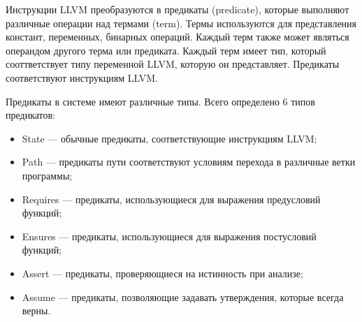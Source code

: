Инструкции LLVM преобразуются в предикаты (predicate), которые выполняют 
различные операции над термами (term). Термы используются для представления 
констант, переменных, бинарных операций. Каждый терм также может являться 
операндом другого терма или предиката. Каждый терм имеет тип, который 
сооттветствует типу переменной LLVM, которую он представляет. Предикаты 
соответствуют инструкциям LLVM.
    
Предикаты в системе имеют различные типы. Всего определено 6 типов предикатов:
\begin{itemize}
\item State --- обычные предикаты, соответствующие инструкциям LLVM;
\item Path --- предикаты пути соответствуют условиям перехода в различные 
ветки программы;
\item Requires --- предикаты, использующиеся для выражения предусловий функций;
\item Ensures --- предикаты, использующиеся для выражения постусловий функций;
\item Assert --- предикаты, проверяющиеся на истинность при анализе;
\item Assume --- предикаты, позволяющие задавать утверждения, которые всегда верны.
\end{itemize}

